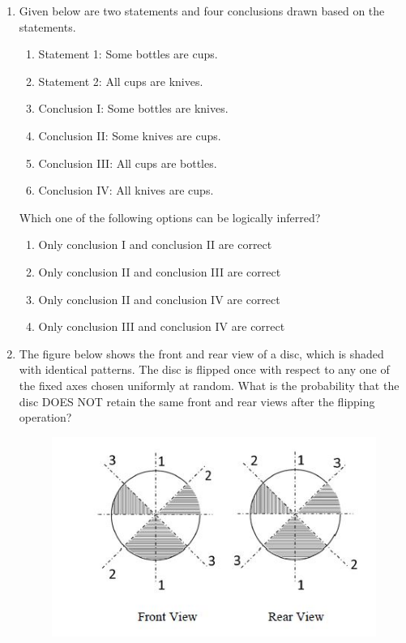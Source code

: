\documentclass[journal,12pt,onecolumn]{IEEEtran}
\theoremstyle{remark}
\begin{document}
\begin{enumerate}
    
\item Given below are two statements and four conclusions drawn based on the statements.  

\begin{enumerate}

\item Statement 1: Some bottles are cups.  
\item Statement 2: All cups are knives.
\item Conclusion I: Some bottles are knives. 
\item Conclusion II: Some knives are cups.
\item Conclusion III: All cups are bottles.
\item Conclusion IV: All knives are cups. 

\end{enumerate}

Which one of the following options can be logically inferred?  

\hfill{}

\begin{enumerate}

\item Only conclusion I and conclusion II are correct  
\item Only conclusion II and conclusion III are correct  
\item Only conclusion II and conclusion IV are correct  
\item Only conclusion III and conclusion IV are correct  

\end{enumerate}
\item The figure below shows the front and rear view of a disc, which is shaded with identical patterns. The disc is flipped once with respect to any one of the fixed axes  chosen uniformly at random. What is the probability that the disc DOES NOT retain the same front and rear views after the flipping operation?

\hfill{}

\begin{figure}
\includegraphics[width = 0.85\columnwidth]{figs/q5.png}
\caption*{}
\label{fig:q5}
\end{figure}


\end{enumerate}
\end{document}
